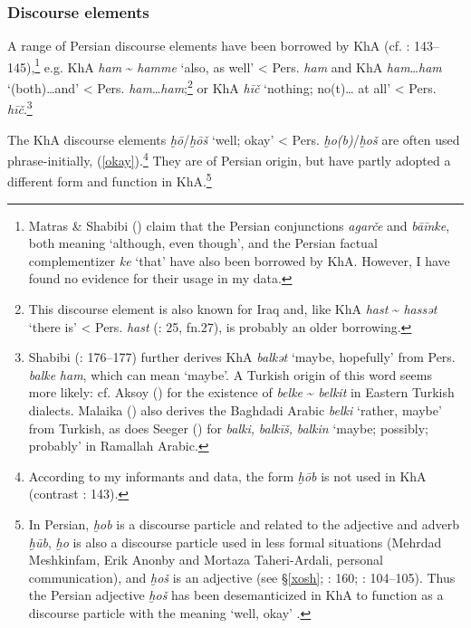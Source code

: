 \documentclass[output=paper,nonflat]{langsci/langscibook}
\begin{document}

\subsubsection{Discourse elements}

A range of Persian discourse elements have been borrowed by KhA (cf. \citealt{MatrasShabibi2007}: 143–145),\footnote{Matras \& Shabibi (\citeyear[144]{MatrasShabibi2007}) claim that the Persian conjunctions \textit{agarče} and \textit{bāīnke}, both meaning ‘although, even though’, and the Persian factual complementizer \textit{ke} ‘that’ have also been borrowed by KhA. However, I have found no evidence for their usage in my data.} e.g. KhA \textit{ham} \~{} \textit{hamme} ‘also, as well’ < Pers. \textit{ham} and KhA \textit{ham}…\textit{ham} ‘(both)…and’ < Pers. \textit{ham}…\textit{ham};\footnote{This discourse element is also known for Iraq \citep[36]{Malaika1963} and, like KhA \textit{hast} \~{} \textit{hassət} ‘there is’ < Pers. \textit{hast} (\citealt{Ingham1973}: 25, fn.27), is probably an older borrowing.} or KhA \textit{hīč} ‘nothing; no(t)… at all’ < Pers. \textit{hīč}.\footnote{Shabibi (\citeyear{Shabibi2006}: 176–177) further derives KhA \textit{balkət} ‘maybe, hopefully’ from Pers. \textit{balke} \textit{ham}, which can mean ‘maybe’. A Turkish origin of this word seems more likely: cf. Aksoy (\citeyear[620]{Aksoy1963}) for the existence of \textit{belke} \~{} \textit{belkit} in Eastern Turkish dialects. Malaika (\citeyear[35]{Malaika1963}) also derives the Baghdadi Arabic \textit{belki} ‘rather, maybe’ from Turkish, as does Seeger (\citeyear[28]{Seeger2009}) for \textit{balki,} \textit{balkīš,} \textit{balkin} ‘maybe; possibly; probably’ in Ramallah Arabic.} 

The KhA discourse elements \textit{ḫō}/\textit{ḫōš} ‘well; okay’ < Pers. \textit{ḫo(b)}/\textit{ḫoš} are often used phrase-initially, (\ref{okay}).\footnote{According to my informants and data, the form \textit{ḫōb} is not used in KhA (contrast \citealt{MatrasShabibi2007}: 143).} They are of Persian origin, but have partly adopted a different form and function in KhA.\footnote{In Persian, \textit{ḫob} is a discourse particle and related to the adjective and adverb \textit{ḫūb}, \textit{ḫo} is also a discourse particle used in less formal situations (Mehrdad Meshkinfam, Erik Anonby and Mortaza Taheri-Ardali, personal communication), and \textit{ḫoš} is an adjective (see §\ref{xosh}; \citealt{Shabibi2006}: 160; \citealt{Mohammadi2018}: 104--105). Thus the Persian adjective \textit{ḫoš} has been desemanticized in KhA to function as a discourse particle with the meaning ‘well, okay’ \citep[160]{Shabibi2006}.}
\end{document}
